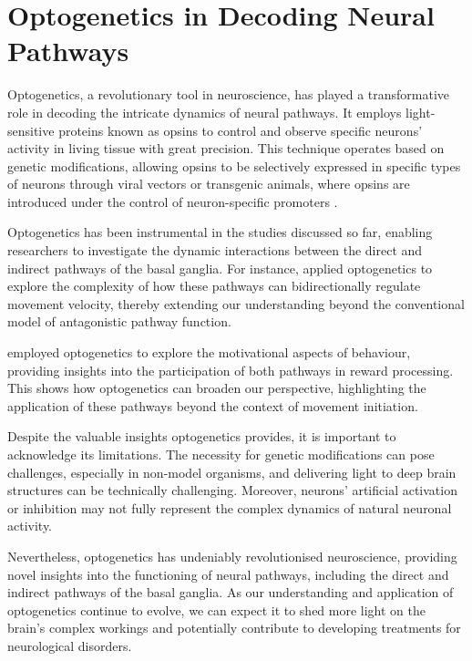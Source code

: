 \documentclass[10pt]{article}
\begin{document}
\begin{sloppypar}
  \section{Optogenetics in Decoding Neural Pathways}
  \label{sec:the-role-of-optogenetics-in-neural-pathways}

  Optogenetics, a revolutionary tool in neuroscience, has played a transformative role in decoding the intricate dynamics of neural pathways. It employs light-sensitive proteins known as opsins to control and observe specific neurons’ activity in living tissue with great precision. This technique operates based on genetic modifications, allowing opsins to be selectively expressed in specific types of neurons through viral vectors or transgenic animals, where opsins are introduced under the control of neuron-specific promoters \citep{deisseroth_next-generation_2006}.

  Optogenetics has been instrumental in the studies discussed so far, enabling researchers to investigate the dynamic interactions between the direct and indirect pathways of the basal ganglia. For instance, \cite{yttri_opponent_2016} applied optogenetics to explore the complexity of how these pathways can bidirectionally regulate movement velocity, thereby extending our understanding beyond the conventional model of antagonistic pathway function.

  \cite{guillaumin_experimental_2021} employed optogenetics to explore the motivational aspects of behaviour, providing insights into the participation of both pathways in reward processing. This shows how optogenetics can broaden our perspective, highlighting the application of these pathways beyond the context of movement initiation.

  Despite the valuable insights optogenetics provides, it is important to acknowledge its limitations. The necessity for genetic modifications can pose challenges, especially in non-model organisms, and delivering light to deep brain structures can be technically challenging. Moreover, neurons’ artificial activation or inhibition may not fully represent the complex dynamics of natural neuronal activity.

  Nevertheless, optogenetics has undeniably revolutionised neuroscience, providing novel insights into the functioning of neural pathways, including the direct and indirect pathways of the basal ganglia. As our understanding and application of optogenetics continue to evolve, we can expect it to shed more light on the brain’s complex workings and potentially contribute to developing treatments for neurological disorders.


\end{sloppypar}
\end{document}
